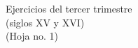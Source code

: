 \documentclass[letterpaper,12pt,notitlepage,spanish]{article}
\begin{document}
%
%
%
\begin{center}
\Large{
Ejercicios del tercer trimestre
} \\ 
(siglos XV y XVI) \\
\vspace*{0.5cm}
%
%
\normalsize %
(Hoja no. 1)

%
%
\end{center}
%
%
%
%
%
%
%
%
\end{document}
